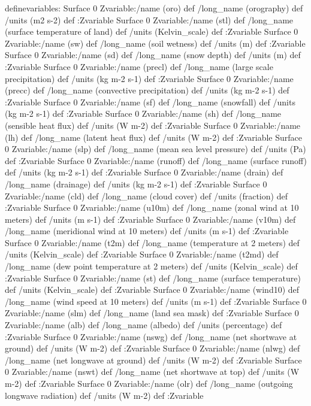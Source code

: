 \begin{ingrid}
definevariables:
Surface 0 Zvariable:/name (oro) def /long_name (orography) def /units (m2 s-2) def  :Zvariable
Surface 0 Zvariable:/name (stl) def /long_name (surface temperature of land) def /units (Kelvin_scale) def  :Zvariable
Surface 0 Zvariable:/name (sw) def /long_name (soil wetness) def /units (m) def  :Zvariable
Surface 0 Zvariable:/name (sd) def /long_name (snow depth) def /units (m) def  :Zvariable
Surface 0 Zvariable:/name (precl) def /long_name (large scale precipitation) def /units (kg m-2 s-1) def  :Zvariable
Surface 0 Zvariable:/name (precc) def /long_name (convective precipitation) def /units (kg m-2 s-1) def  :Zvariable
Surface 0 Zvariable:/name (sf) def /long_name (snowfall) def /units (kg m-2 s-1) def  :Zvariable
Surface 0 Zvariable:/name (sh) def /long_name (sensible heat flux) def /units (W m-2) def  :Zvariable
Surface 0 Zvariable:/name (lh) def /long_name (latent heat flux) def /units (W m-2) def  :Zvariable
Surface 0 Zvariable:/name (slp) def /long_name (mean sea level pressure) def /units (Pa) def  :Zvariable
Surface 0 Zvariable:/name (runoff) def /long_name (surface runoff) def /units (kg m-2 s-1) def  :Zvariable
Surface 0 Zvariable:/name (drain) def /long_name (drainage) def /units (kg m-2 s-1) def  :Zvariable
Surface 0 Zvariable:/name (cld) def /long_name (cloud cover) def /units (fraction) def  :Zvariable
Surface 0 Zvariable:/name (u10m) def /long_name (zonal wind at 10 meters) def /units (m s-1) def  :Zvariable
Surface 0 Zvariable:/name (v10m) def /long_name (meridional wind at 10 meters) def /units (m s-1) def  :Zvariable
Surface 0 Zvariable:/name (t2m) def /long_name (temperature at 2 meters) def /units (Kelvin_scale) def  :Zvariable
Surface 0 Zvariable:/name (t2md) def /long_name (dew point temperature at 2 meters) def /units (Kelvin_scale) def  :Zvariable
Surface 0 Zvariable:/name (st) def /long_name (surface temperature) def /units (Kelvin_scale) def  :Zvariable
Surface 0 Zvariable:/name (wind10) def /long_name (wind speed at 10 meters) def /units (m s-1) def  :Zvariable
Surface 0 Zvariable:/name (slm) def /long_name (land sea mask) def :Zvariable
Surface 0 Zvariable:/name (alb) def /long_name (albedo) def /units (percentage) def :Zvariable
Surface 0 Zvariable:/name (nswg) def /long_name (net shortwave at ground) def /units (W m-2) def  :Zvariable
Surface 0 Zvariable:/name (nlwg) def /long_name (net longwave at ground) def /units (W m-2) def  :Zvariable
Surface 0 Zvariable:/name (nswt) def /long_name (net shortwave at top) def /units (W m-2) def  :Zvariable
Surface 0 Zvariable:/name (olr) def /long_name (outgoing longwave radiation) def /units (W m-2) def  :Zvariable

\end{ingrid}
